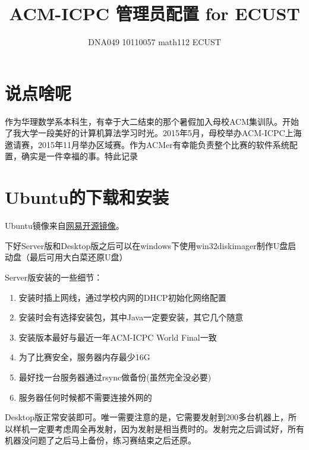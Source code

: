 \documentclass[12pt]{article}
\title{ACM-ICPC 管理员配置 for ECUST}
\author{DNA049 10110057 math112 ECUST}
\begin{document}
\maketitle


\section{说点啥呢}

作为华理数学系本科生，有幸于大二结束的那个暑假加入母校ACM集训队。开始了我大学一段美好的计算机算法学习时光。2015年5月，母校举办ACM-ICPC上海邀请赛，2015年11月举办区域赛。作为ACMer有幸能负责整个比赛的软件系统配置，确实是一件幸福的事。特此记录



\section{Ubuntu的下载和安装}

Ubuntu镜像来自\href{http://mirrors.163.com}{网易开源镜像}。

下好Server版和Desktop版之后可以在windows下使用win32diskimager制作U盘启动盘（最后可用大白菜还原U盘）

Server版安装的一些细节：
\begin{enumerate}
\item
安装时插上网线，通过学校内网的DHCP初始化网络配置
\item
安装时会有选择安装包，其中Java一定要安装，其它几个随意
\item
安装版本最好与最近一年ACM-ICPC World Final一致
\item
为了比赛安全，服务器内存最少16G
\item
最好找一台服务器通过rsync做备份(虽然完全没必要)
\item
服务器任何时候都不需要连接外网的
\end{enumerate}

Desktop版正常安装即可。唯一需要注意的是，它需要发射到200多台机器上，所以样机一定要考虑周全再发射，因为发射是相当费时的。发射完之后调试好，所有机器没问题了之后马上备份，练习赛结束之后还原。
\end{document}
